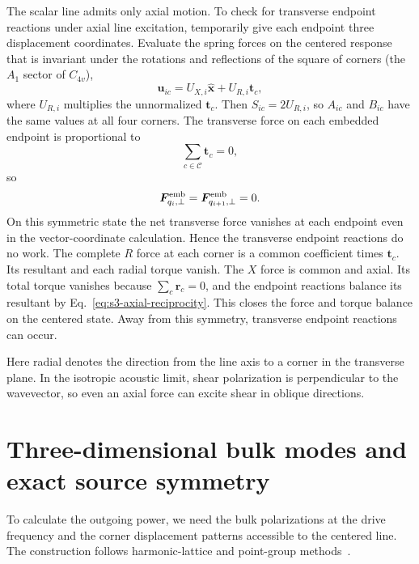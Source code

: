 \documentclass[10pt,aps,onecolumn,floatfix,notitlepage,nofootinbib,showkeys]{revtex4-2}
\newcommand{\vu}{\bm{u}}
\newcommand{\vF}{\bm{F}}
\newcommand{\vrr}{\bm{r}}
\newcommand{\vt}{\bm{t}}
\newcommand{\ex}{\hat{\bm{x}}}
\newcommand{\Cc}{\mathcal C}
\begin{document}
The scalar line admits only axial motion. To check for transverse endpoint reactions under axial line excitation, temporarily give each endpoint three displacement coordinates. Evaluate the spring forces on the centered response that is invariant under the rotations and reflections of the square of corners (the $A_1$ sector of $C_{4v}$),
\begin{equation}
  \vu_{ic}=U_{X,i}\ex+U_{R,i}\vt_c,
  \label{eq:s3-A1-state}
\end{equation}
where $U_{R,i}$ multiplies the unnormalized $\vt_c$. Then $S_{ic}=2U_{R,i}$, so $A_{ic}$ and $B_{ic}$ have the same values at all four corners. The transverse force on each embedded endpoint is proportional to
\begin{equation}
  \sum_{c\in\Cc}\vt_c=0,
  \label{eq:s3-sign-sum}
\end{equation}
so
\begin{equation}
  \vF^{\rm emb}_{q_i,\perp}
  =\vF^{\rm emb}_{q_{i+1},\perp}=0.
  \label{eq:s3-embedded-reaction}
\end{equation}
On this symmetric state the net transverse force vanishes at each endpoint even in the vector-coordinate calculation. Hence the transverse endpoint reactions do no work. The complete $R$ force at each corner is a common coefficient times $\vt_c$. Its resultant and each radial torque vanish. The $X$ force is common and axial. Its total torque vanishes because $\sum_c\vrr_c=0$, and the endpoint reactions balance its resultant by Eq.~\eqref{eq:s3-axial-reciprocity}. This closes the force and torque balance on the centered state. Away from this symmetry, transverse endpoint reactions can occur.

Here radial denotes the direction from the line axis to a corner in the transverse plane. In the isotropic acoustic limit, shear polarization is perpendicular to the wavevector, so even an axial force can excite shear in oblique directions.

\section{Three-dimensional bulk modes and exact source symmetry}
\label{sec:s4-bulk-symmetry}

To calculate the outgoing power, we need the bulk polarizations at the drive frequency and the corner displacement patterns accessible to the centered line. The construction follows harmonic-lattice and point-group methods~\cite{BornHuang1954,Maradudin1971,Dresselhaus2008}.
\end{document}
